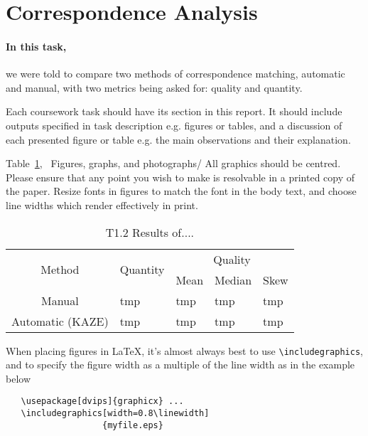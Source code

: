 \documentclass[10pt,twocolumn,letterpaper]{article}
\begin{document}
\section{Correspondence Analysis}

\paragraph{In this task,} we were told to compare two methods of correspondence matching, automatic and manual, with two metrics being asked for: quality and quantity. 

Each coursework task should have its section in this report. It should include outputs specified in task description e.g. figures or tables, and a discussion of each presented figure or table e.g. the main observations and their explanation. 

 Table~\ref{table:1}, {\ Figures, graphs, and photographs/} 
All graphics should be centred.  Please ensure that any point you wish to
make is resolvable in a printed copy of the paper.  Resize fonts in figures
to match the font in the body text, and choose line widths which render
effectively in print. 



\begin{table}[]
   \begin{tabular}{c|l|lll}
   \multirow{2}{*}{Method} & \multirow{2}{*}{Quantity} & \multicolumn{3}{c}{Quality}                                    \\ \cline{3-5} 
                           &                           & \multicolumn{1}{l|}{Mean} & \multicolumn{1}{l|}{Median} & Skew \\ \hline
   Manual                  & tmp                       & \multicolumn{1}{l|}{tmp}  & \multicolumn{1}{l|}{tmp}    & tmp  \\
   Automatic (KAZE)        & tmp                       & \multicolumn{1}{l|}{tmp}  & \multicolumn{1}{l|}{tmp}    & tmp 
   \end{tabular}
   \medbreak
   \caption{T1.2 Results of.... }
   \label{table:1}
\end{table}

When placing figures in \LaTeX, it's almost always best to use
\verb+\includegraphics+, and to specify the  figure width as a multiple of
the line width as in the example below
{\small\begin{verbatim}
   \usepackage[dvips]{graphicx} ...
   \includegraphics[width=0.8\linewidth]
                   {myfile.eps}
\end{verbatim}
}
\end{document}
